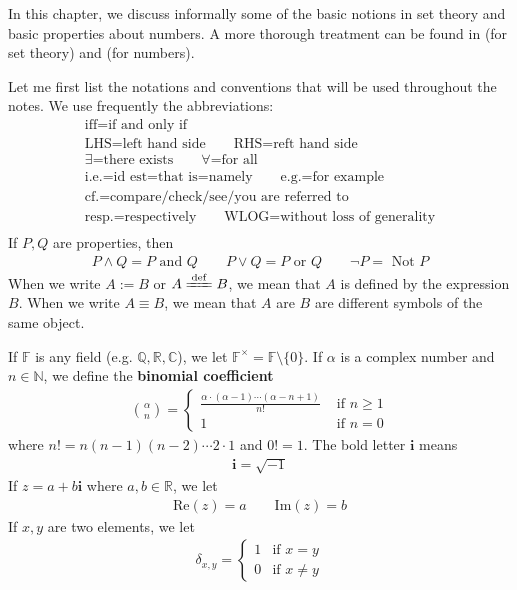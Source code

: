 \documentclass[12pt,b5paper,notitlepage]{article}
\theoremstyle{definition}
\theoremstyle{plain}
\newcommand{\im}{\mathbf{i}}
\newcommand{\Cbb}{\mathbb C}
\newcommand{\Nbb}{\mathbb N}
\newcommand{\Qbb}{\mathbb Q}
\newcommand{\Rbb}{\mathbb R}
\newcommand{\Real}{\mathrm{Re}}
\newcommand{\Imag}{\mathrm{Im}}
\newcommand{\Fbb}{\mathbb F}
\newcommand{\dps}{\displaystyle}
\numberwithin{equation}{section}
\begin{document}
In this chapter, we discuss informally some of the basic notions in set theory and basic properties about numbers. A more thorough treatment can be found in \cite[Ch. 1]{Mun} (for set theory) and \cite[Ch. 1]{Rud-P} (for numbers). 

Let me first list the notations and conventions that will be used throughout the notes. We use frequently the abbreviations:
\begin{gather*}
\text{iff=if and only if}\\
\text{LHS=left hand side}\qquad
\text{RHS=reft hand side}\\
\text{$\exists$=there exists}\qquad \text{$\forall$=for all}\\
\text{i.e.=id est=that is=namely}\qquad\text{e.g.=for example}\\
\text{cf.=compare/check/see/you are referred to}\\
\text{resp.=respectively}\qquad 
\text{WLOG=without loss of generality}\\
\end{gather*}
If $P,Q$ are properties, then
\begin{align*}
P\land Q=P\text{ and }Q\qquad P\lor Q=P\text{ or }Q\qquad \neg P=\text{ Not }P
\end{align*}
When we write $A:=B$ or $A\xlongequal{\mathrm{def}}B$, we mean that $A$ is defined by the expression $B$. When we write $A\equiv B$, we mean that $A$ are $B$ are different symbols of the same object.

If $\Fbb$ is any field (e.g. $\Qbb,\Rbb,\Cbb$), we let $\Fbb^\times=\Fbb\setminus\{0\}$. \index{F@$\Fbb^\times=\Fbb\setminus\{0\}$} If $\alpha$ is a complex number and $n\in\Nbb$, we define the \textbf{binomial coefficient}  
\begin{align}
{\alpha\choose n}=\left\{
\begin{array}{ll}
\dps\frac{\alpha\cdot(\alpha-1)\cdots (\alpha-n+1)}{n!} &\text{ if }n\geq 1\\[1ex]
1&\text{ if }n=0
\end{array}
\right.
\end{align}
where $n!=n(n-1)(n-2)\cdots 2\cdot 1$ and $0!=1$. The bold letter $\im$ means \index{i@$\im=\sqrt{-1}$}
\begin{align*}
\im=\sqrt{-1}
\end{align*}
If $z=a+b\im$ where $a,b\in\Rbb$, we let
\begin{align*}
\Real(z)=a\qquad \Imag(z)=b
\end{align*}
If $x,y$ are two elements, we let 
\begin{align}\label{eq154}
\delta_{x,y}=\left\{
\begin{array}{ll}
1&\text{if }x=y\\
0&\text{if }x\neq y
\end{array}
\right.
\end{align}
\end{document}
